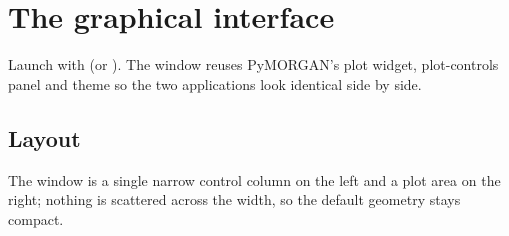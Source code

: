 \section{The graphical interface}\label{sec:gui}

Launch with  (or ). The
window reuses
PyMORGAN's plot widget, plot-controls panel and theme so the two applications
look identical side by side.

\subsection{Layout}

The window is a single narrow control column on the left and a plot area on the
right; nothing is scattered across the width, so the default geometry stays
compact.

